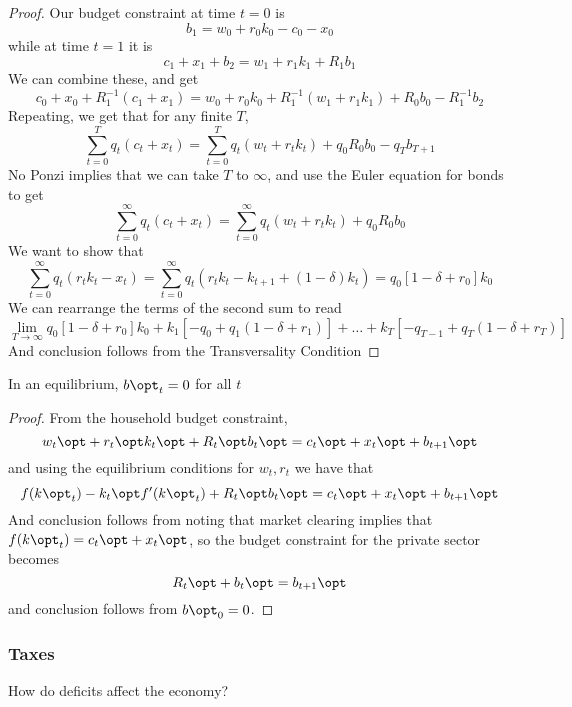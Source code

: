 \documentclass[10pt]{article}
\begin{document}
	\begin{proof}
		Our budget constraint at time $t=0$ is \[b_1= w_0 + r_0k_0 - c_0 - x_0\] while at time $t=1$ it is \[c_1 + x_1 + b_2 = w_1 + r_1k_1 + R_1b_1\]We can combine these, and get \[c_0 + x_0 + R_1^{-1}(c_1+x_1) = w_0 + r_0k_0 + R_1^{-1}(w_1 +r_1k_1) + R_0b_0 - R_1^{-1} b_2\]Repeating, we get that for any finite $T$,\[\sum_{t=0}^T q_t(c_t+x_t) = \sum_{t=0}^T q_t(w_t+r_tk_t)+ q_0 R_0b_0 - q_Tb_{T+1}\]
		No Ponzi implies that we can take $T$ to $\infty$, and use the Euler equation for bonds to get \[\sum_{t=0}^\infty q_t(c_t+x_t) = \sum_{t=0}^\infty q_t(w_t+r_tk_t)+ q_0 R_0b_0\]We want to show that \[\sum_{t=0}^\infty q_t(r_tk_t - x_t) = \sum_{t=0}^\infty q_t(r_tk_t-k_{t+1}+(1-\delta)k_t) = q_0[1-\delta + r_0]k_0 \]
		We can rearrange the terms of the second sum to read \[\lim_{T\to\infty} q_0 [1-\delta + r_0]k_0 + k_1[-q_0 + q_1(1-\delta+r_1)] + \dots +k_T[-q_{T-1} + q_T(1-\delta+r_T)]\]
		And conclusion follows from the Transversality Condition
	\end{proof}
	
	\begin{proposition}
		In an equilibrium, $b\opt_t = 0$ for all $t$
	\end{proposition}
	\begin{proof}
		From the household budget constraint,\[w_t\opt + r_t\opt k_t\opt + R_t\opt b_t\opt = c_t\opt + x_t\opt + b_{t+1}\opt\]and using the equilibrium conditions for $w_t,r_t$ we have that\[f(k\opt_t)  - k_t\opt f'(k\opt_t) + R_t\opt b_t\opt = c_t\opt + x_t\opt + b_{t+1}\opt\]And conclusion follows from noting that market clearing implies that $f(k\opt_t) = c_t\opt + x_t\opt$, so the budget constraint for the private sector becomes \[R_t\opt + b_t\opt = b_{t+1}\opt\]and conclusion follows from $b\opt_0 = 0$.
	\end{proof}
\subsubsection{Taxes}

\begin{question}
	How do deficits affect the economy? 
\end{question}
\end{document}
